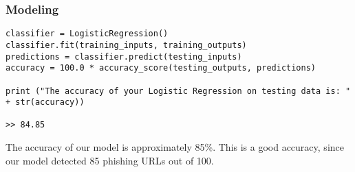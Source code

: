 \begin{frame}[fragile]\frametitle{Modeling}

\begin{lstlisting}
classifier = LogisticRegression()
classifier.fit(training_inputs, training_outputs)
predictions = classifier.predict(testing_inputs)
accuracy = 100.0 * accuracy_score(testing_outputs, predictions)

print ("The accuracy of your Logistic Regression on testing data is: " + str(accuracy))

>> 84.85
\end{lstlisting}

The accuracy of our model is approximately 85\%. This is a good accuracy, since our model detected 85 phishing URLs out of 100. 
\end{frame}